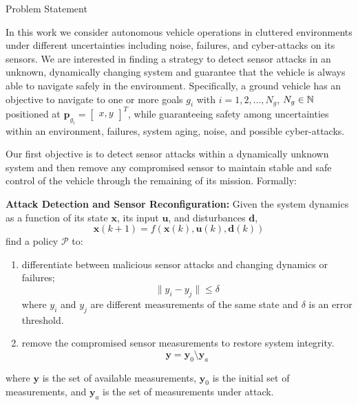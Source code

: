 \begin{section}{Problem Statement}
	
\label{sec:problem}

In this work we consider autonomous vehicle operations in cluttered environments under different uncertainties including noise, failures, and cyber-attacks on its sensors. 
We are interested in finding a strategy to detect sensor attacks in an unknown, dynamically changing system and guarantee that the vehicle is always able to navigate safely in the environment. Specifically, a ground vehicle has an objective to navigate to one or more goals $g_i$ with $ i = 1, 2, \dots, N_g$, $N_g \in \mathbb{N}$ positioned at $\bm{p}_{g_i}={\begin{bmatrix} x,y \end{bmatrix}}^T$, while guaranteeing safety among uncertainties within an environment, failures, system aging, noise, and possible cyber-attacks.



Our first objective is to detect sensor attacks within a dynamically unknown system and then remove any compromised sensor to maintain stable and safe control of the vehicle through the remaining of its mission. Formally:

\begin{problem} 
\label{problem1} {\textbf{Attack Detection and Sensor Reconfiguration:}} 
 Given the system dynamics as a function of its state $ \bm{x} $, its input $ \bm{u}$, and disturbances $ \bm{d} $,
	\begin{equation}
		\bm{x}(k+1) = f(\bm{x}(k), \bm{u}(k), \bm{d}(k))
	\end{equation}
find a policy $\mathcal{P}$ to:
\begin{enumerate}
	\item differentiate between malicious sensor attacks and changing dynamics or failures; 
	\begin{equation}
	\label{eq:detect_attack}
	    \| y_i - y_j \| \leq \delta
	\end{equation}
	where $y_i$ and $y_j$ are different measurements of the same state and $\delta$ is an error threshold. 
	\item remove the compromised sensor measurements to restore system integrity.
	\begin{equation}
	\label{eq:remove_sensors}
	    \bm{y}=\bm{y}_0 \setminus \bm{y}_a
	\end{equation}
\end{enumerate}
where $\bm{y}$ is the set of available measurements, $\bm{y}_0$ is the initial set of measurements, and $\bm{y}_a$ is the set of measurements under attack.



\end{problem}
\end{section}
